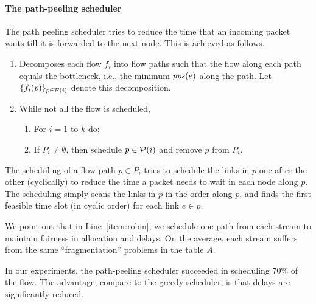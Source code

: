 \documentclass[12pt]{article}
\newenvironment{proof sketch}[1]{\noindent {\emph{Proof sketch of #1:}}}{\hfill \qed}
\newcommand{\pps}{\text{\emph{pps}}}
\begin{document}
\paragraph{The path-peeling scheduler}
The path peeling scheduler tries to reduce the time that an incoming
packet waits till it is forwarded to the next node. This is achieved
as follows.
\begin{enumerate}
\item Decomposes each flow $f_i$ into flow paths such that the flow
  along each path equals the bottleneck, i.e., the minimum $\pps(e)$ along the path.  Let
  $\{f_i(p)\}_{p\in {\cal{P}}(i)}$ denote this decomposition.
\item While not all the flow is scheduled,
  \begin{enumerate}
  \item \label{item:robin} For $i=1$ to $k$ do:
  \item If $P_i\neq \emptyset$, then schedule $p\in {\cal P}(i)$ and remove $p$ from $P_i$.
  \end{enumerate}
\end{enumerate}
The scheduling of a flow path $p\in P_i$ tries to schedule the links in
$p$ one after the other (cyclically) to reduce the time a packet needs to wait in each node
along $p$. The scheduling simply scans the links in $p$ in the order
along $p$, and finds the first feasible time slot (in cyclic order) for
each link $e\in p$.

We point out that in Line~\ref{item:robin}, we schedule one path from
each stream to maintain fairness in allocation and delays. On the average, each stream
suffers from the same ``fragmentation'' problems in the table $A$.

In our experiments, the path-peeling scheduler succeeded in scheduling
70\% of the flow. The advantage, compare to the greedy
scheduler, is that delays are significantly reduced.
\end{document}
